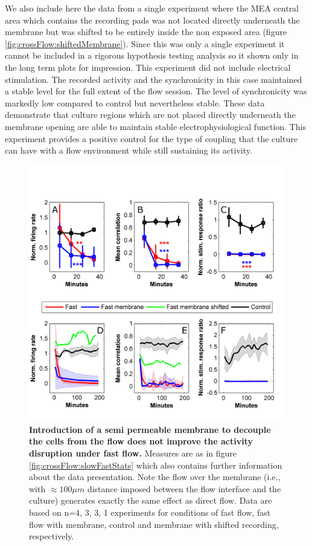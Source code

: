         We also include here the data from a single experiment where the MEA central area which contains the recording pads was not located directly underneath the membrane but was shifted to be entirely inside the non exposed area (figure \ref{fig:crossFlow:shiftedMembrane}). Since this was only a single experiment it cannot be included in a rigorous hypothesis testing analysis so it shown only in the long term plots for impression. This experiment did not include electrical stimulation. The recorded activity and the synchronicity in this case maintained a stable level for the full extent of the flow session. The level of synchronicity was markedly low compared to control but nevertheless stable. These data demonstrate that culture regions which are not placed directly underneath the membrane opening are able to maintain stable electrophysiological function. This experiment provides a positive control for the type of coupling that the culture can have with a flow environment while still sustaining its activity.

        \begin{figure}[!htb]
            \centering
            \includegraphics[width=15cm]{chapter5/figures/fastMembraneStats/fastMembraneStats.jpg}
            \caption[Averaged time course of activity measures in young cultures separated from the fast flow by means of a semi-permeable membrane]{\textbf{Introduction of a semi permeable membrane to decouple the cells from the flow does not improve the activity disruption under fast flow.} Measures are as in figure \ref{fig:crossFlow:slowFastStats} which also contains further information about the data presentation. Note the flow over the membrane (i.e., with \(\approx 100\mu m\) distance imposed between the flow interface and the culture) generates exactly the same effect as direct flow. Data are based on n=4, 3, 3, 1 experiments for conditions of fast flow, fast flow with membrane, control and membrane with shifted recording, respectively.}
            \label{fig:crossFlow:fastMembraneStats}
        \end{figure}

